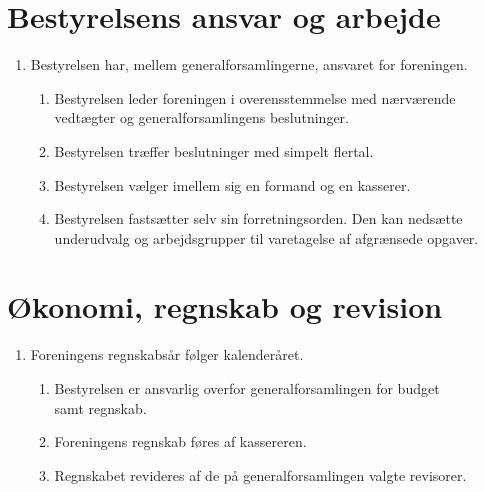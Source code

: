 \documentclass[a4paper]{article}
\newenvironment{stykenum}{
  \begin{enumerate}[%
    label=Stk.~\arabic*., ref=\theenumi~Stk.~\arabic*, start=2]
}{\end{enumerate}}
\begin{document}
\section*{Bestyrelsens ansvar og arbejde}

\begin{enumerate}[resume*=afsnit]

\item Bestyrelsen har, mellem generalforsamlingerne, ansvaret for foreningen.

  \begin{stykenum}

  \item Bestyrelsen leder foreningen i overensstemmelse med nærværende
        vedtægter og generalforsamlingens beslutninger.

  \item Bestyrelsen træffer beslutninger med simpelt flertal.

  \item Bestyrelsen vælger imellem sig en formand og en kasserer.

  \item Bestyrelsen fastsætter selv sin forretningsorden. Den kan nedsætte
        underudvalg og arbejdsgrupper til varetagelse af afgrænsede opgaver.

  \end{stykenum}

\end{enumerate}


\section*{Økonomi, regnskab og revision}

\begin{enumerate}[resume*=afsnit]

\item Foreningens regnskabsår følger kalenderåret.

  \begin{stykenum}

  \item Bestyrelsen er ansvarlig overfor generalforsamlingen for budget\\samt
        regnskab.

  \item Foreningens regnskab føres af kassereren.

  \item Regnskabet revideres af de på generalforsamlingen valgte revisorer.

  \end{stykenum}

\end{enumerate}
\end{document}

